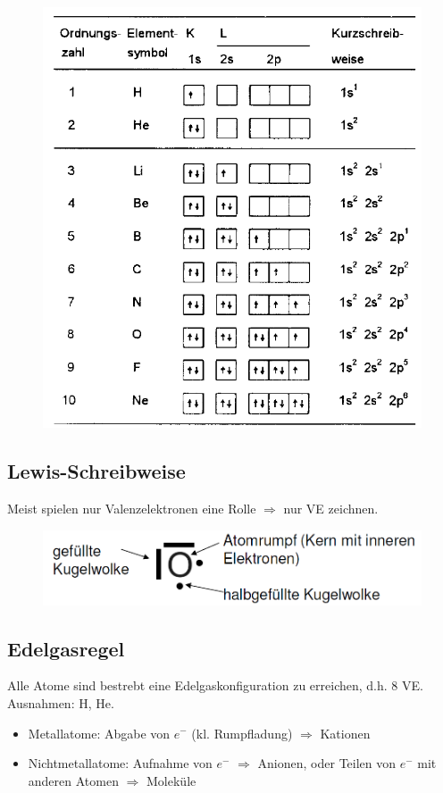\begin{figure}[htbp]
	\centering
	\includegraphics[width=0.8\linewidth]{images/2_Konfiguration_Orbitale.png}
\end{figure}

\subsection{Lewis-Schreibweise}
Meist spielen nur Valenzelektronen eine Rolle $\Rightarrow$ nur VE zeichnen.
\begin{figure}[htbp]
	\centering
	\includegraphics[width=0.5\linewidth]{images/2_Lewis_Schreibweise.png}
\end{figure}

\subsection{Edelgasregel}
Alle Atome sind bestrebt eine Edelgaskonfiguration zu erreichen, d.h. 8 VE. Ausnahmen: H, He. \\

\begin{itemize}
	\item Metallatome: Abgabe von $e^-$ (kl. Rumpfladung) $\Rightarrow$ Kationen
	\item Nichtmetallatome: Aufnahme von $e^-$ $\Rightarrow$ Anionen, oder Teilen von $e^-$ mit anderen Atomen $\Rightarrow$ Moleküle
\end{itemize}
